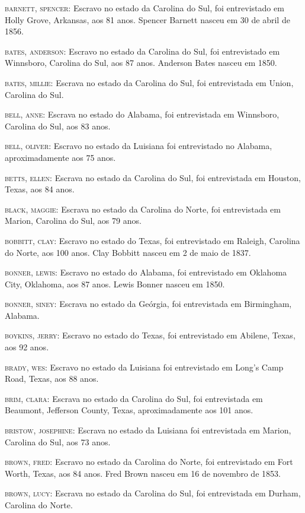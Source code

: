 \begin{Parskip}
\textsc{barnett, spencer:} Escravo no estado da Carolina do Sul, foi
entrevistado em Holly Grove, Arkansas, aos 81 anos. Spencer Barnett
nasceu em 30 de abril de 1856.

\textsc{bates, anderson:} Escravo no estado da Carolina do Sul, foi
entrevistado em Winnsboro, Carolina do Sul, aos 87 anos. Anderson Bates
nasceu em 1850.

\textsc{bates, millie:} Escrava no estado da Carolina do Sul, foi
entrevistada em Union, Carolina do Sul.

\textsc{bell, anne:} Escrava no estado do Alabama, foi entrevistada em
Winnsboro, Carolina do Sul, aos 83 anos.

\textsc{bell, oliver:} Escravo no estado da Luisiana foi entrevistado no
Alabama, aproximadamente aos 75 anos.

\textsc{betts, ellen:} Escrava no estado da Carolina do Sul, foi
entrevistada em Houston, Texas, aos 84 anos.

\textsc{black, maggie:} Escrava no estado da Carolina do Norte, foi
entrevistada em Marion, Carolina do Sul, aos 79 anos.

\textsc{bobbitt, clay:} Escravo no estado do Texas, foi entrevistado em
Raleigh, Carolina do Norte, aos 100 anos. Clay Bobbitt nasceu em 2 de
maio de 1837.

\textsc{bonner, lewis:} Escravo no estado do Alabama, foi entrevistado
em Oklahoma City, Oklahoma, aos 87 anos. Lewis Bonner nasceu em 1850.

\textsc{bonner, siney:} Escrava no estado da Geórgia, foi entrevistada
em Birmingham, Alabama.

\textsc{boykins, jerry:} Escravo no estado do Texas, foi entrevistado em
Abilene, Texas, aos 92 anos.

\textsc{brady, wes:} Escravo no estado da Luisiana foi entrevistado em
Long's Camp Road, Texas, aos 88 anos.

\textsc{brim, clara:} Escrava no estado da Carolina do Sul, foi
entrevistada em Beaumont, Jefferson County, Texas, aproximadamente aos
101 anos.

\textsc{bristow, josephine:} Escrava no estado da Luisiana foi
entrevistada em Marion, Carolina do Sul, aos 73 anos.

\textsc{brown, fred:} Escravo no estado da Carolina do Norte, foi
entrevistado em Fort Worth, Texas, aos 84 anos. Fred Brown nasceu em 16
de novembro de 1853.

\textsc{brown, lucy:} Escrava no estado da Carolina do Sul, foi
entrevistada em Durham, Carolina do Norte.


\end{Parskip}
